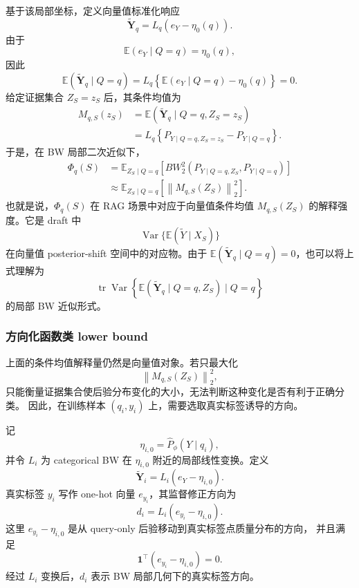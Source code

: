 \documentclass[UTF8,a4paper,12pt,oneside]{ctexart}
\numberwithin{equation}{section}
\begin{document}
基于该局部坐标，定义向量值标准化响应
\[
    \widetilde{\mathbf Y}_q
    =
    L_q(e_Y-\eta_0(q)).
\]
由于
\[
    \mathbb E(e_Y\mid Q=q)
    =
    \eta_0(q),
\]
因此
\[
    \mathbb E(\widetilde{\mathbf Y}_q\mid Q=q)
    =
    L_q
    \left\{
        \mathbb E(e_Y\mid Q=q)-\eta_0(q)
    \right\}
    =
    0.
\]
给定证据集合 \(Z_S=z_S\) 后，其条件均值为
\[
\begin{aligned}
    M_{q,S}(z_S)
    &=
    \mathbb E
    \left(
        \widetilde{\mathbf Y}_q
        \mid Q=q,Z_S=z_S
    \right) \\
    &=
    L_q
    \left\{
        P_{Y\mid Q=q,Z_S=z_S}
        -
        P_{Y\mid Q=q}
    \right\}.
\end{aligned}
\]
于是，在 BW 局部二次近似下，
\[
\begin{aligned}
    \Phi_q(S)
    &=
    \mathbb E_{Z_S\mid Q=q}
    \left[
        BW_2^2
        \left(
            P_{Y\mid Q=q,Z_S},
            P_{Y\mid Q=q}
        \right)
    \right] \\
    &\approx
    \mathbb E_{Z_S\mid Q=q}
    \left[
        \left\|
            M_{q,S}(Z_S)
        \right\|_2^2
    \right].
\end{aligned}
\]
也就是说，\(\Phi_q(S)\) 在 RAG 场景中对应于向量值条件均值
\(M_{q,S}(Z_S)\) 的解释强度。它是 draft 中
\[
    \operatorname{Var}\{\mathbb E(\widetilde Y\mid X_S)\}
\]
在向量值 posterior-shift 空间中的对应物。由于
\(\mathbb E(\widetilde{\mathbf Y}_q\mid Q=q)=0\)，也可以将上式理解为
\[
    \operatorname{tr}
    \operatorname{Var}
    \left\{
        \mathbb E(\widetilde{\mathbf Y}_q\mid Q=q,Z_S)
        \mid Q=q
    \right\}
\]
的局部 BW 近似形式。

\subsubsection{方向化函数类 lower bound}

上面的条件均值解释量仍然是向量值对象。若只最大化
\[
    \left\|
        M_{q,S}(Z_S)
    \right\|_2^2,
\]
只能衡量证据集合使后验分布变化的大小，无法判断这种变化是否有利于正确分类。
因此，在训练样本 \((q_i,y_i)\) 上，需要选取真实标签诱导的方向。

记
\[
    \eta_{i,0}
    =
    \widehat P_\phi(Y\mid q_i),
\]
并令 \(L_i\) 为 categorical BW 在 \(\eta_{i,0}\) 附近的局部线性变换。定义
\[
    \widetilde{\mathbf Y}_i
    =
    L_i(e_Y-\eta_{i,0}).
\]
真实标签 \(y_i\) 写作 one-hot 向量 \(e_{y_i}\)，其监督修正方向为
\[
    d_i
    =
    L_i(e_{y_i}-\eta_{i,0}).
\]
这里 \(e_{y_i}-\eta_{i,0}\) 是从 query-only 后验移动到真实标签点质量分布的方向，
并且满足
\[
    \mathbf 1^\top(e_{y_i}-\eta_{i,0})=0.
\]
经过 \(L_i\) 变换后，\(d_i\) 表示 BW 局部几何下的真实标签方向。
\end{document}
